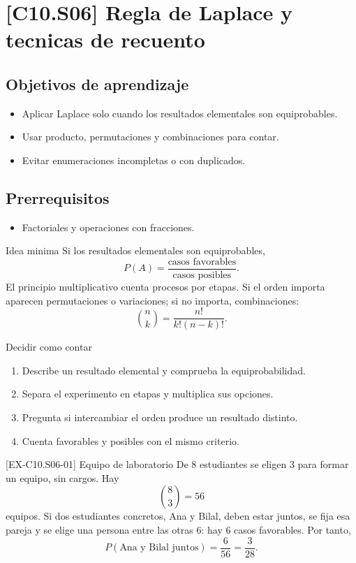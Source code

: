\section{[C10.S06] Regla de Laplace y tecnicas de recuento}

\subsection*{Objetivos de aprendizaje}
\begin{itemize}
  \item Aplicar Laplace solo cuando los resultados elementales son equiprobables.
  \item Usar producto, permutaciones y combinaciones para contar.
  \item Evitar enumeraciones incompletas o con duplicados.
\end{itemize}

\subsection*{Prerrequisitos}
\begin{itemize}
  \item Factoriales y operaciones con fracciones.
\end{itemize}

\begin{theorybox}{Idea minima}
Si los resultados elementales son equiprobables,
\[
P(A)=\frac{\text{casos favorables}}{\text{casos posibles}}.
\]
El principio multiplicativo cuenta procesos por etapas. Si el orden importa aparecen
permutaciones o variaciones; si no importa, combinaciones:
\[
\binom nk=\frac{n!}{k!(n-k)!}.
\]
\end{theorybox}

\begin{methodbox}{Decidir como contar}
\begin{enumerate}
  \item Describe un resultado elemental y comprueba la equiprobabilidad.
  \item Separa el experimento en etapas y multiplica sus opciones.
  \item Pregunta si intercambiar el orden produce un resultado distinto.
  \item Cuenta favorables y posibles con el mismo criterio.
\end{enumerate}
\end{methodbox}

\begin{solvedexample}{[EX-C10.S06-01] Equipo de laboratorio}
De \(8\) estudiantes se eligen \(3\) para formar un equipo, sin cargos. Hay
\[
\binom83=56
\]
equipos. Si dos estudiantes concretos, Ana y Bilal, deben estar juntos, se fija esa pareja y se
elige una persona entre las otras \(6\): hay \(6\) casos favorables. Por tanto,
\[
P(\text{Ana y Bilal juntos})=\frac6{56}=\frac3{28}.
\]
\end{solvedexample}

